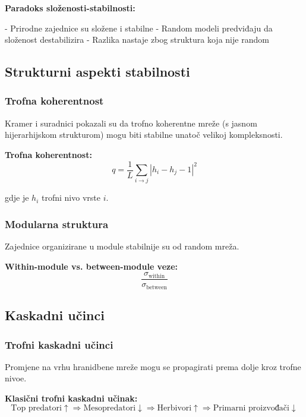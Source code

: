 \documentclass[11pt,oneside]{book}
\begin{document}
\textbf{Paradoks složenosti-stabilnosti:}

- Prirodne zajednice su složene i stabilne
- Random modeli predviđaju da složenost destabilizira
- Razlika nastaje zbog struktura koja nije random

\subsection{Strukturni aspekti stabilnosti}

\subsubsection{Trofna koherentnost}

Kramer i suradnici pokazali su da trofno koherentne mreže (s jasnom hijerarhijskom strukturom) mogu biti stabilne unatoč velikoj kompleksnosti.

\textbf{Trofna koherentnost:}
\begin{equation}
	q = \frac{1}{L} \sum_{i \to j} |h_i - h_j - 1|^2
\end{equation}

gdje je $h_i$ trofni nivo vrste $i$.

\subsubsection{Modularna struktura}

Zajednice organizirane u module stabilnije su od random mreža.

\textbf{Within-module vs. between-module veze:}
\begin{equation}
	\frac{\sigma_{\text{within}}}{\sigma_{\text{between}}}
\end{equation}

\subsection{Kaskadni učinci}

\subsubsection{Trofni kaskadni učinci}

Promjene na vrhu hranidbene mreže mogu se propagirati prema dolje kroz trofne nivoe.

\textbf{Klasični trofni kaskadni učinak:}
\begin{equation}
	\text{Top predatori} \uparrow \Rightarrow \text{Mesopredatori} \downarrow \Rightarrow \text{Herbivori} \uparrow \Rightarrow \text{Primarni proizvođači} \downarrow
\end{equation}
\end{document}
